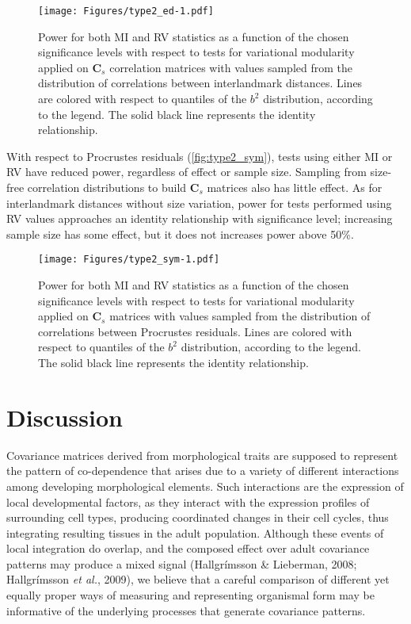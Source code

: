 \documentclass[12pt,]{article}
\begin{document}
\begin{figure}[htbp]
\centering
\texttt{[image: Figures/type2\_ed-1.pdf]}
\caption{Power for both MI and RV statistics as a function of the chosen
significance levels with respect to tests for variational modularity
applied on $\mathbf{C}_s$ correlation matrices with values sampled from
the distribution of correlations between interlandmark distances. Lines
are colored with respect to quantiles of the $b^2$ distribution,
according to the legend. The solid black line represents the identity
relationship. \label{fig:type2_ed}}
\end{figure}

With respect to Procrustes residuals (\autoref{fig:type2_sym}), tests
using either MI or RV have reduced power, regardless of effect or sample
size. Sampling from size-free correlation distributions to build
$\mathbf{C}_s$ matrices also has little effect. As for interlandmark
distances without size variation, power for tests performed using RV
values approaches an identity relationship with significance level;
increasing sample size has some effect, but it does not increases power
above 50\%.

\begin{figure}[htbp]
\centering
\texttt{[image: Figures/type2\_sym-1.pdf]}
\caption{Power for both MI and RV statistics as a function of the chosen
significance levels with respect to tests for variational modularity
applied on $\mathbf{C}_s$ matrices with values sampled from the
distribution of correlations between Procrustes residuals. Lines are
colored with respect to quantiles of the $b^2$ distribution, according
to the legend. The solid black line represents the identity
relationship. \label{fig:type2_sym}}
\end{figure}

\section{Discussion}\label{discussion}

Covariance matrices derived from morphological traits are supposed to
represent the pattern of co-dependence that arises due to a variety of
different interactions among developing morphological elements. Such
interactions are the expression of local developmental factors, as they
interact with the expression profiles of surrounding cell types,
producing coordinated changes in their cell cycles, thus integrating
resulting tissues in the adult population. Although these events of
local integration do overlap, and the composed effect over adult
covariance patterns may produce a mixed signal (Hallgrímsson \&
Lieberman, 2008; Hallgrímsson \emph{et al.}, 2009), we believe that a
careful comparison of different yet equally proper ways of measuring and
representing organismal form may be informative of the underlying
processes that generate covariance patterns.
\end{document}
